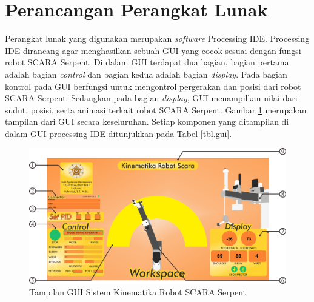 \section{Perancangan Perangkat Lunak}
Perangkat lunak yang digunakan merupakan \textit{software} Processing IDE. Processing IDE dirancang agar menghasilkan sebuah GUI yang cocok sesuai dengan fungsi robot SCARA Serpent. Di dalam GUI terdapat dua bagian,  bagian pertama adalah bagian \textit{control} dan bagian kedua adalah bagian \textit{display}. Pada bagian kontrol pada GUI berfungsi untuk mengontrol pergerakan dan posisi dari robot SCARA Serpent. Sedangkan pada bagian \textit{display}, GUI menampilkan nilai dari sudut, posisi, serta animasi terkait robot SCARA Serpent. Gambar \ref{pic.gui} merupakan tampilan dari GUI secara keseluruhan. Setiap komponen yang ditampilan di dalam GUI processing IDE ditunjukkan pada Tabel \ref{tbl.gui}.
\begin{figure}[H]
	\centering
	\includegraphics[width=12cm ]{gambar/GUI.png}
	\caption{Tampilan GUI Sistem Kinematika Robot SCARA Serpent}
	\label{pic.gui}
\end{figure}

